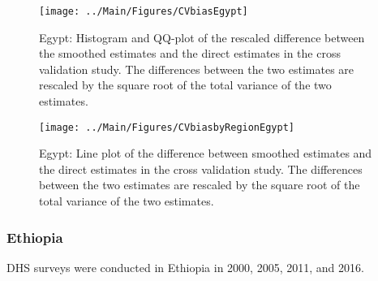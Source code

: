 \documentclass[12pt]{article}\usepackage[]{graphicx}\usepackage[]{color}
\newenvironment{knitrout}{}{} %
\begin{document}
\begin{knitrout}
\color{fgcolor}\begin{figure}[bht]

{\centering \texttt{[image: ../Main/Figures/CVbiasEgypt]} 

}

\caption[Egypt]{Egypt: Histogram and QQ-plot of the rescaled difference between the smoothed estimates and the direct estimates in the cross validation study. The differences between the two estimates are rescaled by the square root of the total variance of the two estimates.}\label{fig:unnamed-chunk-109}
\end{figure}


\end{knitrout}

\begin{knitrout}
\color{fgcolor}\begin{figure}[bht]

{\centering \texttt{[image: ../Main/Figures/CVbiasbyRegionEgypt]} 

}

\caption[Egypt]{Egypt: Line plot of the difference between smoothed estimates and the direct estimates in the cross validation study. The differences between the two estimates are rescaled by the square root of the total variance of the two estimates.}\label{fig:unnamed-chunk-110}
\end{figure}


\end{knitrout}


\clearpage
\subsubsection{Ethiopia}





DHS surveys were conducted in Ethiopia in 2000, 2005, 2011, and 2016.
\end{document}
